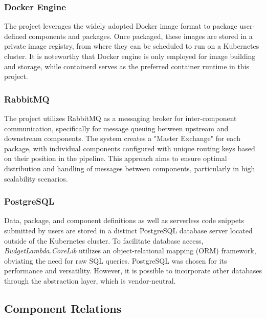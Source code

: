 \documentclass[fleqn,10pt]{SelfArx} %
\begin{document}
\subsubsection{Docker Engine}

The project leverages the widely adopted Docker image format to package user-defined components and packages. Once packaged, these images are stored in a private image registry, from where they can be scheduled to run on a Kubernetes cluster. It is noteworthy that Docker engine is only employed for image building and storage, while containerd serves as the preferred container runtime in this project.

\subsubsection{RabbitMQ}

The project utilizes RabbitMQ as a messaging broker for inter-component communication, specifically for message queuing between upstream and downstream components. The system creates a "Master Exchange" for each package, with individual components configured with unique routing keys based on their position in the pipeline. This approach aims to ensure optimal distribution and handling of messages between components, particularly in high scalability scenarios.

\subsubsection{PostgreSQL}

Data, package, and component definitions as well as serverless code snippets submitted by users are stored in a distinct PostgreSQL database server located outside of the Kubernetes cluster. To facilitate database access, \emph{BudgetLambda.CoreLib} utilizes an object-relational mapping (ORM) framework, obviating the need for raw SQL queries. PostgreSQL was chosen for its performance and versatility. However, it is possible to incorporate other databases through the abstraction layer, which is vendor-neutral.

\subsection{Component Relations}
\end{document}
